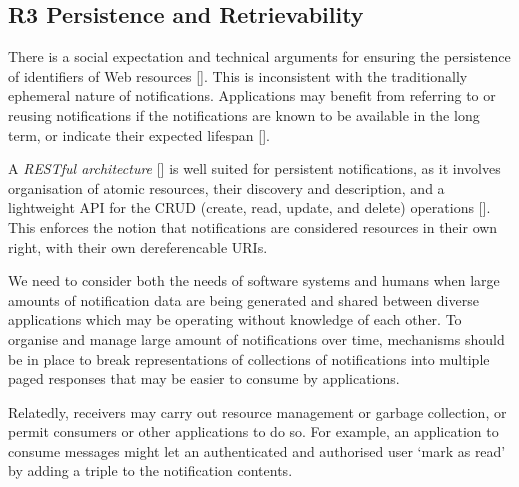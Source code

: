                             

                            
                                \subsection{R3 Persistence and Retrievability}
  \label{persistence-and-retrievability}

                                
                                    
                                    
									
\par There is a social expectation and technical arguments for ensuring the persistence of identifiers of Web resources []. This is inconsistent with the traditionally ephemeral nature of notifications. Applications may benefit from referring to or reusing notifications if the notifications are known to be available in the long term, or indicate their expected lifespan [].

                                    
\par A {\em RESTful architecture} [] is well suited for persistent notifications, as it involves organisation of atomic resources, their discovery and description, and a lightweight API for the CRUD (create, read, update, and delete) operations []. This enforces the notion that notifications are considered resources in their own right, with their own dereferencable URIs.

                                    
\par We need to consider both the needs of software systems and humans when large amounts of notification data are being generated and shared between diverse applications which may be operating without knowledge of each other. To organise and manage large amount of notifications over time, mechanisms should be in place to break representations of collections of notifications into multiple paged responses that may be easier to consume by applications.

                                    
\par Relatedly, receivers may carry out resource management or garbage collection, or permit consumers or other applications to do so. For example, an application to consume messages might let an authenticated and authorised user ‘mark as read’ by adding a triple to the notification contents.
                                

